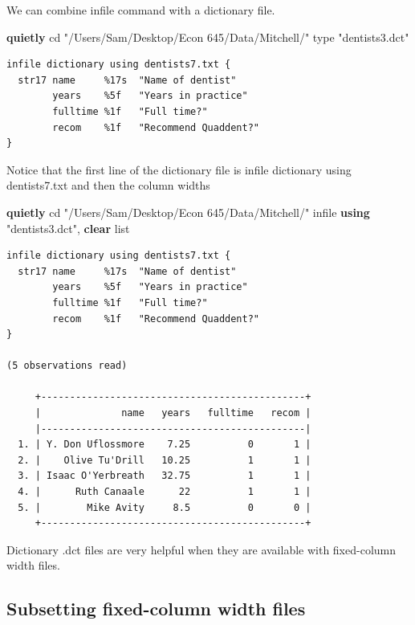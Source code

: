 \documentclass[
]{book}
\newenvironment{Shaded}{\begin{snugshade}}{\end{snugshade}}
\newcommand{\DecValTok}[1]{\textcolor[rgb]{0.00,0.00,0.81}{#1}}
\newcommand{\KeywordTok}[1]{\textcolor[rgb]{0.13,0.29,0.53}{\textbf{#1}}}
\newcommand{\NormalTok}[1]{#1}
\newcommand{\OtherTok}[1]{\textcolor[rgb]{0.56,0.35,0.01}{#1}}
\newcommand{\StringTok}[1]{\textcolor[rgb]{0.31,0.60,0.02}{#1}}
\begin{document}
We can combine infile command with a dictionary file.

\begin{Shaded}
\begin{Highlighting}[]
\KeywordTok{quietly}\NormalTok{ cd }\StringTok{"/Users/Sam/Desktop/Econ 645/Data/Mitchell/"}
\DecValTok{type} \StringTok{"dentists3.dct"}
\end{Highlighting}
\end{Shaded}

\begin{verbatim}
infile dictionary using dentists7.txt {
  str17 name     %17s  "Name of dentist"
        years    %5f   "Years in practice"
        fulltime %1f   "Full time?"
        recom    %1f   "Recommend Quaddent?"
}
\end{verbatim}

Notice that the first line of the dictionary file is
infile dictionary using dentists7.txt and then the column widths

\begin{Shaded}
\begin{Highlighting}[]
\KeywordTok{quietly}\NormalTok{ cd }\StringTok{"/Users/Sam/Desktop/Econ 645/Data/Mitchell/"}
\NormalTok{infile }\KeywordTok{using} \StringTok{"dentists3.dct"}\NormalTok{, }\KeywordTok{clear}
\OtherTok{list}
\end{Highlighting}
\end{Shaded}

\begin{verbatim}
infile dictionary using dentists7.txt {
  str17 name     %17s  "Name of dentist"
        years    %5f   "Years in practice"
        fulltime %1f   "Full time?"
        recom    %1f   "Recommend Quaddent?"
}

(5 observations read)

     +----------------------------------------------+
     |              name   years   fulltime   recom |
     |----------------------------------------------|
  1. | Y. Don Uflossmore    7.25          0       1 |
  2. |    Olive Tu'Drill   10.25          1       1 |
  3. | Isaac O'Yerbreath   32.75          1       1 |
  4. |      Ruth Canaale      22          1       1 |
  5. |        Mike Avity     8.5          0       0 |
     +----------------------------------------------+
\end{verbatim}

Dictionary .dct files are very helpful when they are available with fixed-column width files.

\subsection{Subsetting fixed-column width files}\label{subsetting-fixed-column-width-files}
\end{document}
